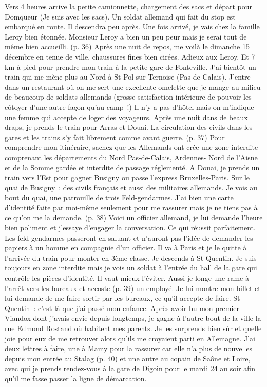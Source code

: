 \documentclass[a5paper,pagesize,10pt,bibtotoc,pointlessnumbers,
normalheadings,DIV=9,twoside=false]{scrbook}
\begin{document}
	Vers 4 heures arrive la petite camionnette, chargement des sacs et départ pour Domqueur (Je suis avec les sacs). Un soldat allemand qui fait du stop est embarqué en route. Il descendra peu après. Une fois arrivé, je vais chez la famille Leroy bien étonnée. Monsieur Leroy a bien un peu peur mais je serai tout de même bien accueilli. (p. 36) Après une nuit de repos, me voilà le dimanche 15 décembre en tenue de ville, chaussures fines bien cirées. Adieux aux Leroy. Et 7 km à pied pour prendre mon train à la petite gare de Fonteville. J’ai bientôt un train qui me mène plus au Nord à St Pol-sur-Ternoise (Pas-de-Calais). J’entre dans un restaurant où on me sert une excellente omelette que je mange au milieu de beaucoup de soldats allemands (grosse satisfaction intérieure de pouvoir les côtoyer d’une autre façon qu’au camp !) Il n’y a pas d’hôtel mais on m’indique une femme qui accepte de loger des voyageurs. Après une nuit dans de beaux draps, je prends le train pour Arras et Douai. La circulation des civils dans les gares et les trains s’y fait librement comme avant guerre.
	(p. 37) Pour comprendre mon itinéraire, sachez que les Allemands ont crée une zone interdite comprenant les départements du Nord Pas-de-Calais, Ardennes- Nord de l’Aisne et de la Somme gardée et interdite de passage réglementé. 
	A Douai, je prends un train vers l’Est pour gagner Busigny ou passe l’express Bruxelles-Paris.
	Sur le quai de Busigny : des civils français et aussi des militaires allemands. Je vois au bout du quai, une patrouille de trois Feld-gendarmes. J’ai bien une carte d’identité faite par moi-même seulement pour me rassurer mais je ne tiens pas à ce qu’on me la demande. (p. 38) Voici un officier allemand, je lui demande l’heure bien poliment et j’essaye d’engager la conversation. Ce qui réussit parfaitement. Les feld-gendarmes passeront en saluant et n’auront pas l’idée de demander les papiers à un homme en compagnie d’un officier. Il va à Paris et je le quitte à l’arrivée du train pour monter en 3ème classe. Je descends à St Quentin. Je suis toujours en zone interdite mais je vois un soldat à l’entrée du hall de la gare qui contrôle les pièces d’identité. Il vaut mieux l’éviter. Aussi je longe une rame à l’arrêt vers les bureaux et accoste (p. 39) un employé. Je lui montre mon billet et lui demande de me faire sortir par les bureaux, ce qu’il accepte de faire. St Quentin : c’est là que j’ai passé mon enfance. Après avoir bu mon premier Viandox dont j’avais envie depuis longtemps, je gagne à l’autre bout de la ville la rue Edmond Rostand où habitent mes parents. Je les surprends bien sûr et quelle joie pour eux de me retrouver alors qu’ils me croyaient parti en Allemagne. J’ai deux lettres à faire, une à Mamy pour la rassurer car elle n’a plus de nouvelles depuis mon entrée au Stalag (p. 40) et une autre au copain de Saône et Loire, avec qui je prends rendez-vous à la gare de Digoin pour le mardi 24 au soir afin qu’il me fasse passer la ligne de démarcation. 
\end{document}

